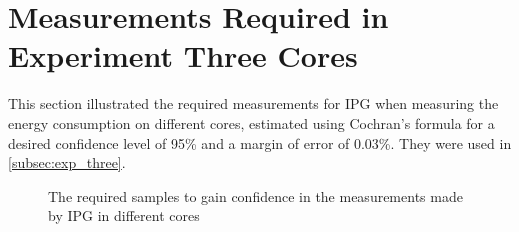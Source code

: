 \section{Measurements Required in Experiment Three Cores}\label{app:exp_three_coch}

This section illustrated the required measurements for IPG when measuring the energy consumption on different cores, estimated using Cochran's formula for a desired confidence level of 95\% and a margin of error of 0.03\%. They were used in \cref{subsec:exp_three}.

% 
% 

\begin{figure}[H]
    \centering
    \begin{subfigure}[b]{0.4\textwidth}
        \centering
        
    \end{subfigure}
    \hfill
    \begin{subfigure}[b]{0.4\textwidth}
        \centering
        
    \end{subfigure}
    \caption{The required samples to gain confidence in the measurements made by IPG in different cores}
\end{figure}